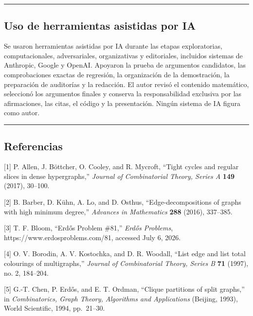 \documentclass[
  spanish,
  11pt,
  a4paper,
]{article}
\begin{document}
\begin{center}\rule{0.5\linewidth}{0.5pt}\end{center}

\subsection{Uso de herramientas asistidas por IA}\label{uso-de-herramientas-asistidas-por-ia}

Se usaron herramientas asistidas por IA durante las etapas exploratorias, computacionales, adversariales, organizativas y editoriales, incluidos sistemas de Anthropic, Google y OpenAI. Apoyaron la prueba de argumentos candidatos, las comprobaciones exactas de regresión, la organización de la demostración, la preparación de auditorías y la redacción. El autor revisó el contenido matemático, seleccionó los argumentos finales y conserva la responsabilidad exclusiva por las afirmaciones, las citas, el código y la presentación. Ningún sistema de IA figura como autor.

\begin{center}\rule{0.5\linewidth}{0.5pt}\end{center}

\begingroup
\setlength{\parskip}{2pt plus 1pt minus 1pt}
\subsection{Referencias}\label{referencias}

{[}1{]} P. Allen, J. Böttcher, O. Cooley, and R. Mycroft, ``Tight cycles and regular slices in dense hypergraphs,'' \emph{Journal of Combinatorial Theory, Series A} \textbf{149} (2017), 30--100.

{[}2{]} B. Barber, D. Kühn, A. Lo, and D. Osthus, ``Edge-decompositions of graphs with high minimum degree,'' \emph{Advances in Mathematics} \textbf{288} (2016), 337--385.

{[}3{]} T. F. Bloom, ``Erdős Problem \#81,'' \emph{Erdős Problems}, https://www.erdosproblems.com/81, accessed July 6, 2026.

{[}4{]} O. V. Borodin, A. V. Kostochka, and D. R. Woodall, ``List edge and list total colourings of multigraphs,'' \emph{Journal of Combinatorial Theory, Series B} \textbf{71} (1997), no. 2, 184--204.

{[}5{]} G.-T. Chen, P. Erdős, and E. T. Ordman, ``Clique partitions of split graphs,'' in \emph{Combinatorics, Graph Theory, Algorithms and Applications} (Beijing, 1993), World Scientific, 1994, pp.~21--30.
\end{document}
